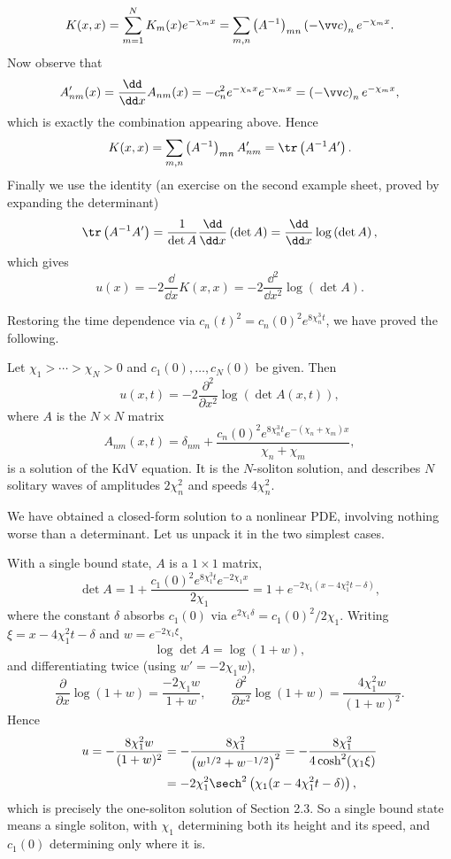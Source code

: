 $$
K(x,x) = \sum_{m=1}^NK_m(x)e^{-\chi_mx} = \sum_{m,n}\left(A^{-1}\right)_{mn}\left(-\vv c\right)_ne^{-\chi_mx}.
$$
Now observe that
$$
A'_{nm}(x) = \frac{\dd}{\dd x}A_{nm}(x) = -c_n^2e^{-\chi_nx}e^{-\chi_mx} = \left(-\vv c\right)_ne^{-\chi_mx},
$$
which is exactly the combination appearing above. Hence
$$
K(x,x) = \sum_{m,n}\left(A^{-1}\right)_{mn}A'_{nm} = \tr\left(A^{-1}A'\right).
$$
Finally we use the identity (an exercise on the second example sheet, proved by expanding the determinant)
$$
\tr\left(A^{-1}A'\right) = \frac{1}{\det A}\frac{\dd}{\dd x}\left(\det A\right) = \frac{\dd}{\dd x}\log\left(\det A\right),
$$
which gives
$$
u(x) = -2\frac{\dd}{\dd x}K(x,x) = -2\frac{\dd^2}{\dd x^2}\log\left(\det A\right).
$$

Restoring the time dependence via $c_n(t)^2 = c_n(0)^2e^{8\chi_n^3t}$, we have proved the following.

\begin{theorem}
	Let $\chi_1 > \cdots > \chi_N > 0$ and $c_1(0), \dots, c_N(0)$ be given. Then
	$$
	u(x,t) = -2\frac{\partial^2}{\partial x^2}\log\left(\det A(x,t)\right),
	$$
	where $A$ is the $N\times N$ matrix
	$$
	A_{nm}(x,t) = \delta_{nm} + \frac{c_n(0)^2e^{8\chi_n^3t}e^{-(\chi_n+\chi_m)x}}{\chi_n+\chi_m},
	$$
	is a solution of the KdV equation. It is the $N$-soliton solution, and describes $N$ solitary waves of amplitudes $2\chi_n^2$ and speeds $4\chi_n^2$.
\end{theorem}

We have obtained a closed-form solution to a nonlinear PDE, involving nothing worse than a determinant. Let us unpack it in the two simplest cases.

\begin{example}[$N = 1$]
	With a single bound state, $A$ is a $1\times1$ matrix,
	$$
	\det A = 1 + \frac{c_1(0)^2e^{8\chi_1^3t}e^{-2\chi_1x}}{2\chi_1} = 1 + e^{-2\chi_1(x - 4\chi_1^2t - \delta)},
	$$
	where the constant $\delta$ absorbs $c_1(0)$ via $e^{2\chi_1\delta} = c_1(0)^2/2\chi_1$. Writing $\xi = x - 4\chi_1^2t-\delta$ and $w = e^{-2\chi_1\xi}$,
	$$
	\log\det A = \log(1 + w),
	$$
	and differentiating twice (using $w' = -2\chi_1w$),
	$$
	\frac{\partial}{\partial x}\log(1+w) = \frac{-2\chi_1w}{1+w}, \qquad \frac{\partial^2}{\partial x^2}\log(1+w) = \frac{4\chi_1^2w}{(1+w)^2}.
	$$
	Hence
	\begin{align*}
		u = -\frac{8\chi_1^2w}{(1+w)^2} &= -\frac{8\chi_1^2}{\left(w^{1/2} + w^{-1/2}\right)^2} = -\frac{8\chi_1^2}{4\cosh^2(\chi_1\xi)}\\
		&= -2\chi_1^2\sech^2\left(\chi_1(x - 4\chi_1^2t - \delta)\right),
	\end{align*}
	which is precisely the one-soliton solution of Section 2.3. So a single bound state means a single soliton, with $\chi_1$ determining both its height and its speed, and $c_1(0)$ determining only where it is.
\end{example}

